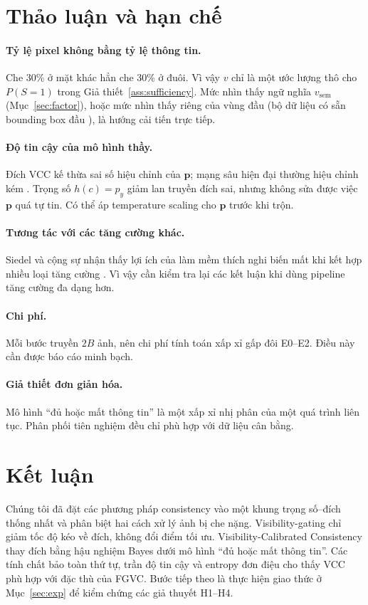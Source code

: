 \documentclass[11pt,a4paper]{article}
\theoremstyle{plain}
\theoremstyle{definition}
\theoremstyle{remark}
\newcommand{\bp}{\bm{p}}
\begin{document}
\section{Thảo luận và hạn chế}
\label{sec:discussion}

\paragraph{Tỷ lệ pixel không bằng tỷ lệ thông tin.} Che 30\% ở mặt khác hẳn che 30\% ở đuôi. Vì vậy $v$ chỉ là một ước lượng thô cho $P(S=1)$ trong Giả thiết~\ref{ass:sufficiency}. Mức nhìn thấy ngữ nghĩa $v_{\mathrm{sem}}$ (Mục~\ref{sec:factor}), hoặc mức nhìn thấy riêng của vùng đầu (bộ dữ liệu có sẵn bounding box đầu \cite{parkhi2012cats}), là hướng cải tiến trực tiếp.

\paragraph{Độ tin cậy của mô hình thầy.} Đích VCC kế thừa sai số hiệu chỉnh của $\bp$; mạng sâu hiện đại thường hiệu chỉnh kém \cite{guo2017calibration}. Trọng số $h(c)=p_y$ giảm lan truyền đích sai, nhưng không sửa được việc $\bp$ quá tự tin. Có thể áp temperature scaling cho $\bp$ trước khi trộn.

\paragraph{Tương tác với các tăng cường khác.} Siedel và cộng sự nhận thấy lợi ích của làm mềm thích nghi biến mất khi kết hợp nhiều loại tăng cường \cite{siedel2026combined}. Vì vậy cần kiểm tra lại các kết luận khi dùng pipeline tăng cường đa dạng hơn.

\paragraph{Chi phí.} Mỗi bước truyền $2B$ ảnh, nên chi phí tính toán xấp xỉ gấp đôi E0--E2. Điều này cần được báo cáo minh bạch.

\paragraph{Giả thiết đơn giản hóa.} Mô hình ``đủ hoặc mất thông tin'' là một xấp xỉ nhị phân của một quá trình liên tục. Phân phối tiên nghiệm đều chỉ phù hợp với dữ liệu cân bằng.

\section{Kết luận}

Chúng tôi đã đặt các phương pháp consistency vào một khung trọng số--đích thống nhất và phân biệt hai cách xử lý ảnh bị che nặng. Visibility-gating chỉ giảm tốc độ kéo về đích, không đổi điểm tối ưu. Visibility-Calibrated Consistency thay đích bằng hậu nghiệm Bayes dưới mô hình ``đủ hoặc mất thông tin''. Các tính chất bảo toàn thứ tự, trần độ tin cậy và entropy đơn điệu cho thấy VCC phù hợp với đặc thù của FGVC. Bước tiếp theo là thực hiện giao thức ở Mục~\ref{sec:exp} để kiểm chứng các giả thuyết H1--H4.



\end{document}
